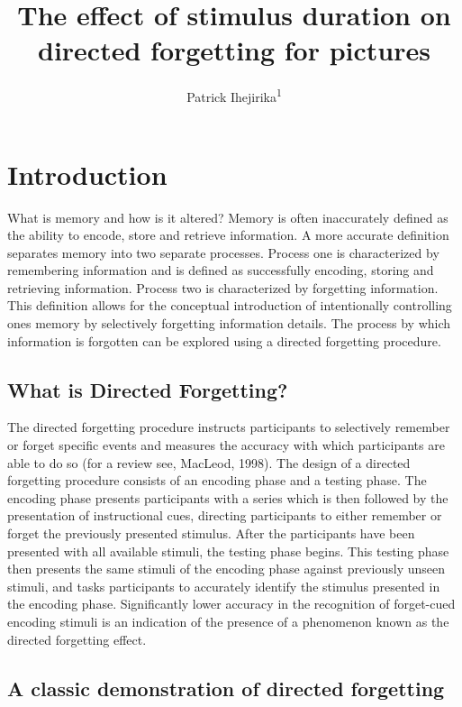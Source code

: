 \documentclass[
  english,
  man,floatsintext]{apa6}
\title{The effect of stimulus duration on directed forgetting for pictures}
\author{Patrick Ihejirika\textsuperscript{1}}
\date{}
\affiliation{\vspace{0.5cm}\textsuperscript{1} Brooklyn College of CUNY}
\begin{document}
\maketitle

\hypertarget{introduction}{%
\section{Introduction}\label{introduction}}

What is memory and how is it altered? Memory is often inaccurately defined as the ability to encode, store and retrieve information. A more accurate definition separates memory into two separate processes. Process one is characterized by remembering information and is defined as successfully encoding, storing and retrieving information. Process two is characterized by forgetting information. This definition allows for the conceptual introduction of intentionally controlling ones memory by selectively forgetting information details. The process by which information is forgotten can be explored using a directed forgetting procedure.

\hypertarget{what-is-directed-forgetting}{%
\subsection{What is Directed Forgetting?}\label{what-is-directed-forgetting}}

The directed forgetting procedure instructs participants to selectively remember or forget specific events and measures the accuracy with which participants are able to do so (for a review see, MacLeod, 1998). The design of a directed forgetting procedure consists of an encoding phase and a testing phase. The encoding phase presents participants with a series which is then followed by the presentation of instructional cues, directing participants to either remember or forget the previously presented stimulus. After the participants have been presented with all available stimuli, the testing phase begins. This testing phase then presents the same stimuli of the encoding phase against previously unseen stimuli, and tasks participants to accurately identify the stimulus presented in the encoding phase. Significantly lower accuracy in the recognition of forget-cued encoding stimuli is an indication of the presence of a phenomenon known as the directed forgetting effect.

\hypertarget{a-classic-demonstration-of-directed-forgetting}{%
\subsection{A classic demonstration of directed forgetting}\label{a-classic-demonstration-of-directed-forgetting}}
\end{document}
